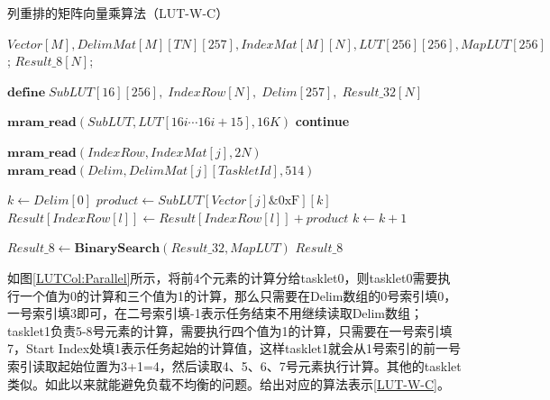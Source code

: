 \begin{algorithm}[!htbp]
    \caption{列重排的矩阵向量乘算法（LUT-W-C）}
    \label{LUT-W-C}
    \begin{algorithmic}[1]
        \Require $Vector[M], DelimMat[M][TN][257], IndexMat[M][N], LUT[256][256], MapLUT[256]$; %
        \Ensure $Result\_8[N]$; %

        \State $\textbf{define}\; SubLUT[16][256],\;IndexRow[N],\;Delim[257],\;Result\_32[N]$

            \State $\textbf{mram\_read}(SubLUT, LUT[16i \cdots 16i + 15], 16K)$
            \Comment{\textcolor{blue}{parallel read}}
                    \State \textbf{continue}
                \EndIf
                
                \State $\textbf{mram\_read}(IndexRow, IndexMat[j], 2N)$
                \Comment{\textcolor{blue}{parallel read}}
                \State $\textbf{mram\_read}(Delim, DelimMat[j][TaskletId], 514)$

                \State $k \gets Delim[0]$
                    \State $product \gets SubLUT[Vector[j] \& \text{0xF}][k]$
                        \State $Result[IndexRow[l]] \gets Result[IndexRow[l]] + product$
                    \EndFor
                    \State $k \gets k + 1$
                \EndWhile
            \EndFor
        \EndFor

        \State $Result\_8 \gets \textbf{BinarySearch}(Result\_32, MapLUT)$
        \Comment{\textcolor{blue}{parallel in N}}
        \State \Return $Result\_8$
    \end{algorithmic}
\end{algorithm}

如图\ref{LUTCol:Parallel}所示，将前4个元素的计算分给tasklet0，则tasklet0需要执行一个值为0的计算和三个值为1的计算，那么只需要在Delim数组的0号索引填0，一号索引填3即可，在二号索引填-1表示任务结束不用继续读取Delim数组；tasklet1负责5-8号元素的计算，需要执行四个值为1的计算，只需要在一号索引填7，Start Index处填1表示任务起始的计算值，这样tasklet1就会从1号索引的前一号索引读取起始位置为3+1=4，然后读取4、5、6、7号元素执行计算。其他的tasklet类似。如此以来就能避免负载不均衡的问题。给出对应的算法表示\ref{LUT-W-C}。

